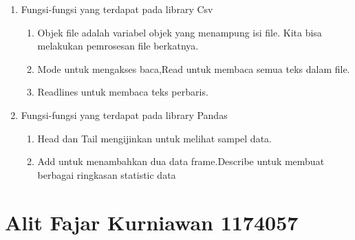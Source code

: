 \begin{enumerate}
\item{Fungsi-fungsi yang terdapat pada library Csv}

\begin{enumerate}
\item Objek file adalah variabel objek yang menampung isi file. Kita bisa melakukan pemrosesan file berkatnya.
\item Mode untuk mengakses baca,Read untuk membaca semua  teks dalam file.
\item Readlines untuk membaca teks perbaris.
	\end{enumerate}


\item{Fungsi-fungsi yang terdapat pada library Pandas}

\begin{enumerate}
\item Head dan Tail mengijinkan  untuk  melihat sampel data.
\item Add untuk menambahkan dua data frame.Describe untuk membuat  berbagai ringkasan statistic data
\end{enumerate}


\end{enumerate}

\section{Alit Fajar Kurniawan  1174057}
